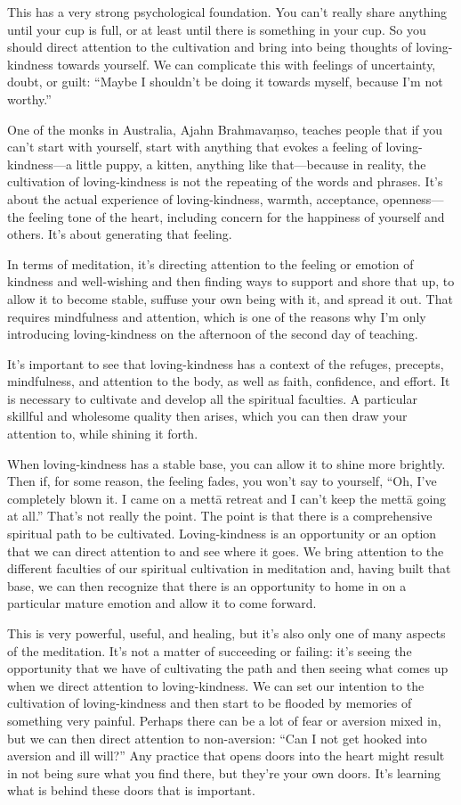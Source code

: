 This has a very strong psychological foundation. You can’t really share
anything until your cup is full, or at least until there is something in
your cup. So you should direct attention to the cultivation and bring
into being thoughts of loving-kindness towards yourself. We can
complicate this with feelings of uncertainty, doubt, or guilt: “Maybe I
shouldn’t be doing it towards myself, because I’m not worthy.”

One of the monks in Australia, Ajahn Brahmavaṃso, teaches people that if
you can’t start with yourself, start with anything that evokes a feeling
of loving-kindness—a little puppy, a kitten, anything like that—because
in reality, the cultivation of loving-kindness is not the repeating of
the words and phrases. It’s about the actual experience of
loving-kindness, warmth, acceptance, openness—the feeling tone of the
heart, including concern for the happiness of yourself and others. It’s
about generating that feeling.

In terms of meditation, it’s directing attention to the feeling or
emotion of kindness and well-wishing and then finding ways to support
and shore that up, to allow it to become stable, suffuse your own being
with it, and spread it out. That requires mindfulness and attention,
which is one of the reasons why I’m only introducing loving-kindness on
the afternoon of the second day of teaching.

It’s important to see that loving-kindness has a context of the refuges,
precepts, mindfulness, and attention to the body, as well as faith,
confidence, and effort. It is necessary to cultivate and develop all the
spiritual faculties. A particular skillful and wholesome quality then
arises, which you can then draw your attention to, while shining it
forth.

When loving-kindness has a stable base, you can allow it to shine more
brightly. Then if, for some reason, the feeling fades, you won’t say to
yourself, “Oh, I’ve completely blown it. I came on a mettā retreat and I
can’t keep the mettā going at all.” That’s not really the point. The
point is that there is a comprehensive spiritual path to be cultivated.
Loving-kindness is an opportunity or an option that we can direct
attention to and see where it goes. We bring attention to the different
faculties of our spiritual cultivation in meditation and, having built
that base, we can then recognize that there is an opportunity to home in
on a particular mature emotion and allow it to come forward.

This is very powerful, useful, and healing, but it’s also only one of
many aspects of the meditation. It’s not a matter of succeeding or
failing: it’s seeing the opportunity that we have of cultivating the
path and then seeing what comes up when we direct attention to
loving-kindness. We can set our intention to the cultivation of
loving-kindness and then start to be flooded by memories of something
very painful. Perhaps there can be a lot of fear or aversion mixed in,
but we can then direct attention to non-aversion: “Can I not get hooked
into aversion and ill will?” Any practice that opens doors into the
heart might result in not being sure what you find there, but they’re
your own doors. It’s learning what is behind these doors that is
important.

